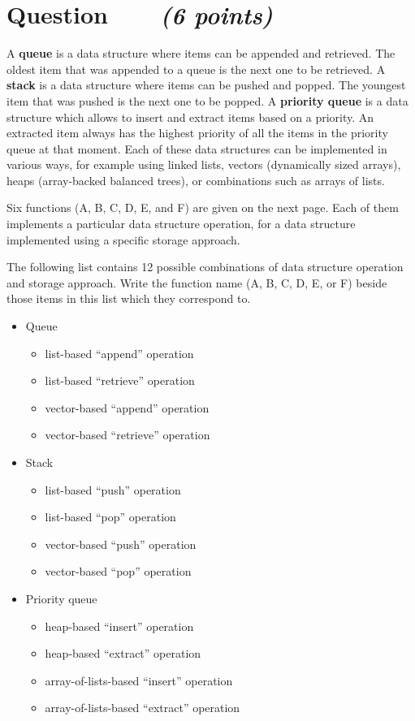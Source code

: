 \documentclass[a4paper]{article}
\newcounter{question}
\newcommand{\question}[1]{\refstepcounter{question}\section*{Question~\thequestion~~~\small\emph{(#1)}}}
\renewcommand*\thequestion{\arabic{question}}
\begin{document}
\pagebreak
\pagestyle{plain}
\thispagestyle{plain}
\setcounter{page}{1}



\question{6 points}

A \textbf{queue} is a data structure where items can be appended and retrieved.
The oldest item that was appended to a queue is the next one to be retrieved.
A \textbf{stack} is a data structure where items can be pushed and popped.
The youngest item that was pushed is the next one to be popped.
A \textbf{priority queue} is a data structure which allows to insert and extract items based on a priority.
An extracted item always has the highest priority of all the items in the priority queue at that moment.
Each of these data structures can be implemented in various ways, for example using linked lists, vectors (dynamically sized arrays), heaps (array-backed balanced trees), or combinations such as arrays of lists.

\vfill

Six functions (A, B, C, D, E, and F) are given on the next page.
Each of them implements a particular data structure operation, for a data structure implemented using a specific storage approach.

The following list contains 12 possible combinations of data structure operation and storage approach.
Write the function name (A, B, C, D, E, or F) beside those items in this list which they correspond to.

\begin{itemize}
\item
  Queue
  \begin{itemize}
  \item
    list-based ``append'' operation
  \item
    list-based ``retrieve'' operation
  \item
    vector-based ``append'' operation
  \item
    vector-based ``retrieve'' operation
  \end{itemize}
\item
  Stack
  \begin{itemize}
  \item
    list-based ``push'' operation
  \item
    list-based ``pop'' operation
  \item
    vector-based ``push'' operation
  \item
    vector-based ``pop'' operation
  \end{itemize}
\item
  Priority queue
  \begin{itemize}
  \item
    heap-based ``insert'' operation
  \item
    heap-based ``extract'' operation
  \item
    array-of-lists-based ``insert'' operation
  \item
    array-of-lists-based ``extract'' operation
  \end{itemize}
\end{itemize}
\end{document}
